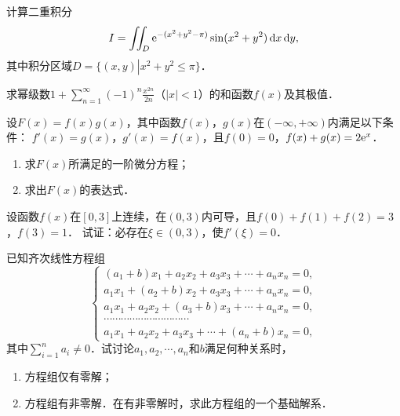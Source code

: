\documentclass[plain,noanswer,medmath]{../../template/jnuexam}
\begin{document}
\begin{problem}
计算二重积分
$$I = \iint_D \mathrm{e}^{- (x^2 + y^2 - \pi)}\sin(x^2 + y^2)\mathop{}\!\mathrm{d} x\mathop{}\!\mathrm{d} y,$$
其中积分区域$D = \{(x,y)\left| x^2 + y^2 \le \pi \right.\}$．
\end{problem}



\begin{problem}
求幂级数$1 + \sum_{n = 1}^{\infty}(- 1)^n\frac{x^{2n}}{2n}$（$|x| < 1$）的和函数$f(x)$及其极值．
\end{problem}



\begin{problem}
设$F(x) = f(x)g(x)$，其中函数$f(x)$，$g(x)$在$(-\infty , +\infty)$内满足以下条件：\goodbreak
$f'(x) = g(x)$，$g'(x) = f(x)$，且$f(0) = 0$，$f(x) + g(x) = 2\mathrm{e}^x$．
\begin{enumerate}
\item 求$F(x)$所满足的一阶微分方程；
\item 求出$F(x)$的表达式．
\end{enumerate}
\end{problem}



\begin{problem}
设函数$f(x)$在$[0,3]$上连续，在$(0,3)$内可导，且$f(0) + f(1) + f(2) = 3$，$f(3) = 1$．
试证：必存在$\xi \in(0,3)$，使$f'(\xi) = 0$．
\end{problem}



\begin{problem}
已知齐次线性方程组
$$\begin{cases}
  (a_1 + b) x_1 + a_2x_2 + a_3x_3 + \cdots + a_n x_n = 0, \\
  a_1x_1 + (a_2 + b) x_2 + a_3x_3 + \cdots + a_n x_n = 0, \\
  a_1x_1 + a_2x_2 + (a_3 + b) x_3 + \cdots + a_n x_n = 0, \\
  \cdots \cdots \cdots \cdots \cdots \cdots \cdots \cdots \cdots \cdots \\
  a_1x_1 + a_2x_2 + a_3x_3 + \cdots + (a_n + b) x_n = 0,
\end{cases}$$
其中$\sum_{i = 1}^n a_i \ne 0$．试讨论$a_1,a_2, \cdots ,a_n$和$b$满足何种关系时，
\begin{enumerate}
\item 方程组仅有零解；
\item 方程组有非零解．在有非零解时，求此方程组的一个基础解系．
\end{enumerate}
\end{problem}
\end{document}
